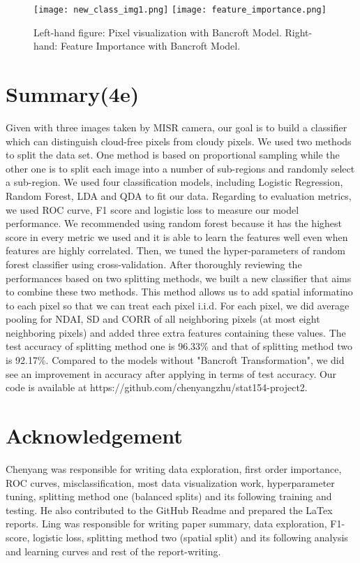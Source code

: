 \documentclass[letterpaper,11pt]{article}
\begin{document}
\begin{figure}
    \centering
    \texttt{[image: new\_class\_img1.png]}
    \texttt{[image: feature\_importance.png]}
    \caption{Left-hand figure: Pixel visualization with Bancroft Model. Right-hand: Feature Importance with Bancroft Model.}
    \label{fig:fi}
\end{figure}

\section{Summary(4e)}
Given with three images taken by MISR camera, our goal is to build a classifier which can distinguish cloud-free pixels from cloudy pixels. We used two methods to split the data set. One method is based on proportional sampling while the other one is to split each image into a number of sub-regions and randomly select a sub-region. We used four classification models, including Logistic Regression, Random Forest, LDA and QDA to fit our data. Regarding to evaluation metrics, we used ROC curve, F1 score and logistic loss to measure our model performance. We recommended using random forest because it has the highest score in every metric we used and it is able to learn the features well even when features are highly correlated. Then, we tuned the hyper-parameters of random forest classifier using cross-validation. After thoroughly reviewing the performances based on two splitting methods, we built a new classifier that aims to combine these two methods. This method allows us to add spatial informatino to each pixel so that we can treat each pixel i.i.d. For each pixel, we did average pooling for NDAI, SD and CORR of all neighboring pixels (at most eight neighboring pixels) and added three extra features containing these values. The test accuracy of splitting method one is 96.33\% and that of splitting method two is 92.17\%. Compared to the models without "Bancroft Transformation", we did see an improvement in accuracy after applying in terms of test accuracy. Our code is available at https://github.com/chenyangzhu/stat154-project2.

\section{Acknowledgement}
Chenyang was responsible for writing data exploration, first order importance, ROC curves, misclassification, most data visualization work, hyperparameter tuning, splitting method one (balanced splits) and its following training and testing. He also contributed to the GitHub Readme and prepared the LaTex reports. Ling was responsible for writing paper summary, data exploration, F1-score, logistic loss, splitting method two (spatial split) and its following analysis and learning curves and rest of the report-writing. 
\end{document}
